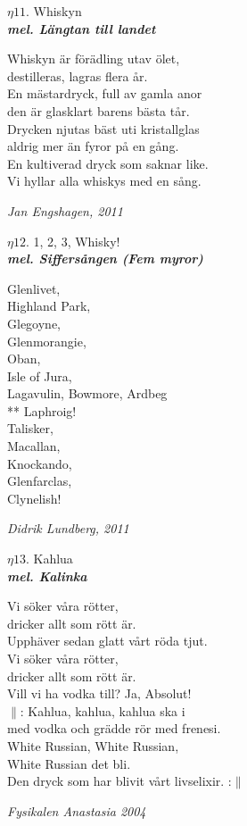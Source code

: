 \documentclass[a6paper,10pt]{article}
\newcommand{\mel}[1]{\small\textbf{\textit{mel. #1 \\}}}
\newcommand{\notis}[1]{\begin{flushright}\textit{#1}\end{flushright}}
\begin{document}
\setlength{\oddsidemargin}{-0.47in}
\noindent
\begin{center}
\Large $\eta11$. Whiskyn\\
\mel{Längtan till landet}
\end{center} 
Whiskyn är förädling utav ölet,\\
destilleras, lagras flera år.\\
En mästardryck, full av gamla anor\\
den är glasklart barens bästa tår.
\vspace{5pt}\\
Drycken njutas bäst uti kristallglas\\
aldrig mer än fyror på en gång.\\
En kultiverad dryck som saknar like.\\
Vi hyllar alla whiskys med en sång.
\notis{Jan Engshagen, 2011}
\begin{center}
\Large $\eta12$. 1, 2, 3, Whisky!\\
\mel{Siffersången (Fem myror)}
\end{center} 
Glenlivet,\\
Highland Park,\\
Glegoyne,\\
Glenmorangie,\\
Oban,\\
Isle of Jura,\\
Lagavulin, Bowmore, Ardbeg\\
** Laphroig!\\
Talisker,\\
Macallan,\\
Knockando,\\
Glenfarclas,\\
Clynelish!
\notis{Didrik Lundberg, 2011}

\setlength{\oddsidemargin}{-0.37in}
\noindent
\begin{center}
\Large $\eta13$. Kahlua\\
\mel{Kalinka}
\end{center}
Vi söker våra rötter,\\
dricker allt som rött är.\\
Upphäver sedan glatt vårt röda tjut.
\vspace{5pt}\\
Vi söker våra rötter,\\
dricker allt som rött är.\\
Vill vi ha vodka till? Ja, Absolut!
\vspace{5pt}\\
$\|$: Kahlua, kahlua, kahlua ska i\\
med vodka och grädde rör med frenesi.\\
White Russian, White Russian, \\
White Russian det bli.\\
Den dryck som har blivit vårt livselixir. :$\|$
\notis{Fysikalen Anastasia 2004}
\end{document}
